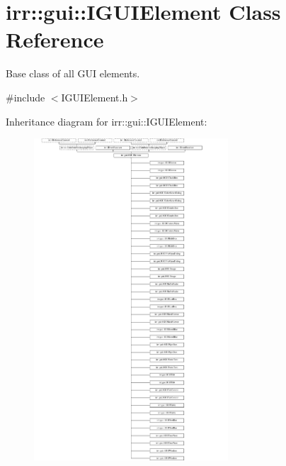 \hypertarget{classirr_1_1gui_1_1IGUIElement}{}\section{irr\+:\+:gui\+:\+:I\+G\+U\+I\+Element Class Reference}
\label{classirr_1_1gui_1_1IGUIElement}


Base class of all G\+UI elements.  




{\ttfamily \#include $<$I\+G\+U\+I\+Element.\+h$>$}

Inheritance diagram for irr\+:\+:gui\+:\+:I\+G\+U\+I\+Element\+:\begin{figure}[H]
\begin{center}
\leavevmode
\includegraphics[height=12.000000cm]{classirr_1_1gui_1_1IGUIElement}
\end{center}
\end{figure}
